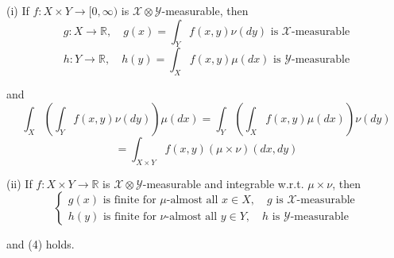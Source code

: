 \begin{theorem}
(i) If \( f: X \times Y \rightarrow [0, \infty) \) is \(\mathcal{X} \otimes \mathcal{Y}\)-measurable, then
\[
g: X \rightarrow \mathbb{R}, \quad g(x) = \int_Y f(x,y) \nu(dy) \text{ is } \mathcal{X}\text{-measurable}
\]
\[
h: Y \rightarrow \mathbb{R}, \quad h(y) = \int_X f(x,y) \mu(dx) \text{ is } \mathcal{Y}\text{-measurable}
\]

and
\[
\int_X \left( \int_Y f(x,y) \nu(dy) \right) \mu(dx) = \int_Y \left( \int_X f(x,y) \mu(dx) \right) \nu(dy)
\]
\[
= \int_{X \times Y} f(x,y) (\mu \times \nu)(dx,dy) \tag{4}
\]

(ii) If \( f: X \times Y \rightarrow \mathbb{R} \) is \(\mathcal{X} \otimes \mathcal{Y}\)-measurable and integrable w.r.t. \(\mu \times \nu\), then
\[
\begin{cases}
g(x) \text{ is finite for } \mu\text{-almost all } x \in X, \quad g \text{ is } \mathcal{X}\text{-measurable} \\
h(y) \text{ is finite for } \nu\text{-almost all } y \in Y, \quad h \text{ is } \mathcal{Y}\text{-measurable}
\end{cases}
\]

and (4) holds.
\end{theorem}
